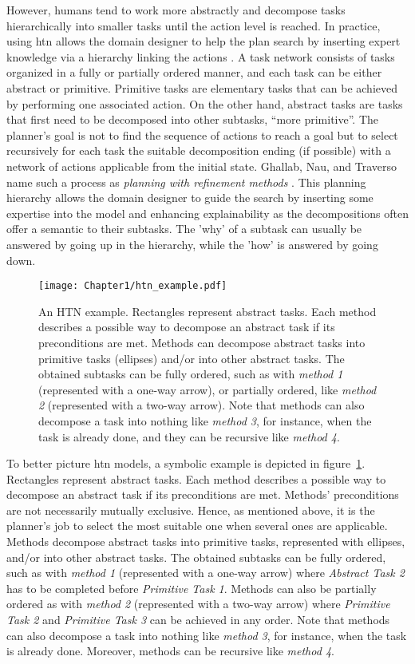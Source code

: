 However, humans tend to work more abstractly and decompose tasks hierarchically into smaller tasks until the action level is reached. In practice, using \acrfull{htn} allows the domain designer to help the plan search by inserting expert knowledge via a hierarchy linking the actions \cite{erol_complexity_1996}. A task network consists of tasks organized in a fully or partially ordered manner, and each task can be either abstract or primitive. Primitive tasks are elementary tasks that can be achieved by performing one associated action.
On the other hand, abstract tasks are tasks that first need to be decomposed into other subtasks, ``more primitive''. The planner's goal is not to find the sequence of actions to reach a goal but to select recursively for each task the suitable decomposition ending (if possible) with a network of actions applicable from the initial state. Ghallab, Nau, and Traverso name such a process as \textit{planning with refinement methods} \cite{ghallab2016automated}. This planning hierarchy allows the domain designer to guide the search by inserting some expertise into the model and enhancing explainability as the decompositions often offer a semantic to their subtasks. The 'why' of a subtask can usually be answered by going up in the hierarchy, while the 'how' is answered by going down. 

\begin{figure}
    \center
    \texttt{[image: Chapter1/htn\_example.pdf]}
    \caption{An HTN example. Rectangles represent abstract tasks. Each method describes a possible way to decompose an abstract task if its preconditions are met. Methods can decompose abstract tasks into primitive tasks (ellipses) and/or into other abstract tasks. The obtained subtasks can be fully ordered, such as with \emph{method 1} (represented with a one-way arrow), or partially ordered, like \emph{method 2} (represented with a two-way arrow). Note that methods can also decompose a task into nothing like \emph{method 3}, for instance, when the task is already done, and they can be recursive like \emph{method 4}.
    }
    \label{fig:htn_example}
\end{figure}

To better picture \acrshort{htn} models, a symbolic example is depicted in figure~\ref{fig:htn_example}.
Rectangles represent abstract tasks. Each method describes a possible way to decompose an abstract task if its preconditions are met. Methods' preconditions are not necessarily mutually exclusive. Hence, as mentioned above, it is the planner's job to select the most suitable one when several ones are applicable.
Methods decompose abstract tasks into primitive tasks, represented with ellipses, and/or into other abstract tasks. The obtained subtasks can be fully ordered, such as with \emph{method 1} (represented with a one-way arrow) where \emph{Abstract Task 2} has to be completed before \emph{Primitive Task 1}. Methods can also be partially ordered as with \emph{method 2} (represented with a two-way arrow) where \emph{Primitive Task 2} and \emph{Primitive Task 3} can be achieved in any order. Note that methods can also decompose a task into nothing like \emph{method 3}, for instance, when the task is already done. Moreover, methods can be recursive like \emph{method 4}.


